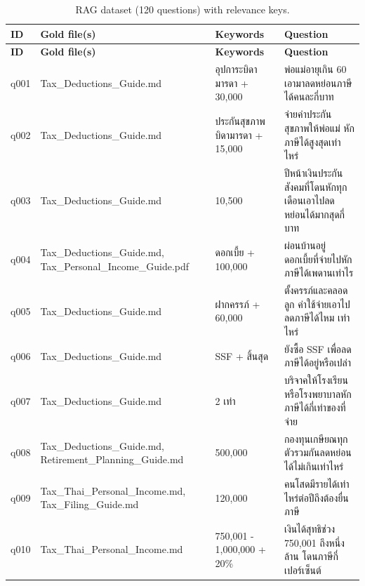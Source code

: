 \documentclass[11pt,a4paper]{article}
\begin{document}
{\scriptsize
\begin{longtable}{lp{3.6cm}p{3.4cm}p{6.3cm}}
\caption{RAG dataset (120 questions) with relevance keys.}\label{tab:app-rag}\\
\toprule
\textbf{ID} & \textbf{Gold file(s)} & \textbf{Keywords} & \textbf{Question} \\
\midrule
\endfirsthead
\toprule
\textbf{ID} & \textbf{Gold file(s)} & \textbf{Keywords} & \textbf{Question} \\
\midrule
\endhead
\bottomrule
\endfoot
q001 & Tax\_\allowbreak{}Deductions\_\allowbreak{}Guide.md & {\thaifont อุปการะบิดามารดา }+ 30,000 & {\thaifont พ่อแม่อายุเกิน }60 {\thaifont เอามาลดหย่อนภาษีได้คนละกี่บาท} \\
q002 & Tax\_\allowbreak{}Deductions\_\allowbreak{}Guide.md & {\thaifont ประกันสุขภาพบิดามารดา }+ 15,000 & {\thaifont จ่ายค่าประกันสุขภาพให้พ่อแม่ หักภาษีได้สูงสุดเท่าไหร่} \\
q003 & Tax\_\allowbreak{}Deductions\_\allowbreak{}Guide.md & 10,500 & {\thaifont ปีหน้าเงินประกันสังคมที่โดนหักทุกเดือนเอาไปลดหย่อนได้มากสุดกี่บาท} \\
q004 & Tax\_\allowbreak{}Deductions\_\allowbreak{}Guide.md, Tax\_\allowbreak{}Personal\_\allowbreak{}Income\_\allowbreak{}Guide.pdf & {\thaifont ดอกเบี้ย }+ 100,000 & {\thaifont ผ่อนบ้านอยู่ ดอกเบี้ยที่จ่ายไปหักภาษีได้เพดานเท่าไร} \\
q005 & Tax\_\allowbreak{}Deductions\_\allowbreak{}Guide.md & {\thaifont ฝากครรภ์ }+ 60,000 & {\thaifont ตั้งครรภ์และคลอดลูก ค่าใช้จ่ายเอาไปลดภาษีได้ไหม เท่าไหร่} \\
q006 & Tax\_\allowbreak{}Deductions\_\allowbreak{}Guide.md & SSF + {\thaifont สิ้นสุด} & {\thaifont ยังซื้อ }SSF {\thaifont เพื่อลดภาษีได้อยู่หรือเปล่า} \\
q007 & Tax\_\allowbreak{}Deductions\_\allowbreak{}Guide.md & 2 {\thaifont เท่า} & {\thaifont บริจาคให้โรงเรียนหรือโรงพยาบาลหักภาษีได้กี่เท่าของที่จ่าย} \\
q008 & Tax\_\allowbreak{}Deductions\_\allowbreak{}Guide.md, Retirement\_\allowbreak{}Planning\_\allowbreak{}Guide.md & 500,000 & {\thaifont กองทุนเกษียณทุกตัวรวมกันลดหย่อนได้ไม่เกินเท่าไหร่} \\
q009 & Tax\_\allowbreak{}Thai\_\allowbreak{}Personal\_\allowbreak{}Income.md, Tax\_\allowbreak{}Filing\_\allowbreak{}Guide.md & 120,000 & {\thaifont คนโสดมีรายได้เท่าไหร่ต่อปีถึงต้องยื่นภาษี} \\
q010 & Tax\_\allowbreak{}Thai\_\allowbreak{}Personal\_\allowbreak{}Income.md & 750,001 - 1,000,000 + 20\% & {\thaifont เงินได้สุทธิช่วง }750,001 {\thaifont ถึงหนึ่งล้าน โดนภาษีกี่เปอร์เซ็นต์} \\

\end{longtable}}
\end{document}
